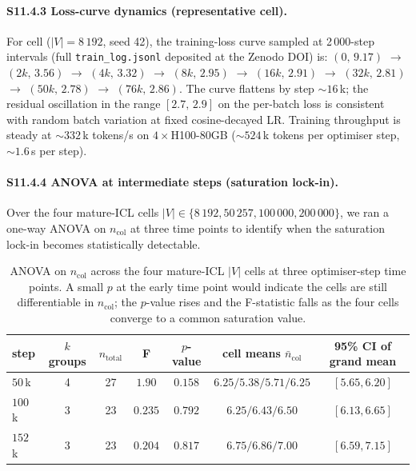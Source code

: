 \documentclass[11pt,a4paper]{article}
\begin{document}
\paragraph{S11.4.3 Loss-curve dynamics (representative cell).}
For cell ($|V|\!=\!8\,192$, seed 42), the training-loss curve
sampled at 2\,000-step intervals (full \texttt{train\_log.jsonl}
deposited at the Zenodo DOI) is:
$(0,\,9.17)$ $\to$ $(2k,\,3.56)$ $\to$ $(4k,\,3.32)$ $\to$
$(8k,\,2.95)$ $\to$ $(16k,\,2.91)$ $\to$ $(32k,\,2.81)$ $\to$
$(50k,\,2.78)$ $\to$ $(76k,\,2.86)$. The curve flattens by
step $\sim\!16$\,k; the residual oscillation in the range
$[2.7,\,2.9]$ on the per-batch loss is consistent with random
batch variation at fixed cosine-decayed LR. Training throughput is
steady at $\sim\!332$\,k tokens/s on $4\!\times\!$H100-80GB
($\sim\!524$\,k tokens per optimiser step, $\sim\!1.6$\,s per step).

\paragraph{S11.4.4 ANOVA at intermediate steps (saturation lock-in).}
Over the four mature-ICL cells $|V|\!\in\!\{8\,192, 50\,257,
100\,000, 200\,000\}$, we ran a one-way ANOVA on $n_\mathrm{col}$
at three time points to identify when the saturation lock-in
becomes statistically detectable.

\begin{table}[h]
\centering
\small
\caption{ANOVA on $n_\mathrm{col}$ across the four mature-ICL
$|V|$ cells at three optimiser-step time points.
A small $p$ at the early time point would indicate the cells are
still differentiable in $n_\mathrm{col}$; the $p$-value rises and
the F-statistic falls as the four cells converge to a common
saturation value.}
\label{tab:S11-anova-intermediate}
\begin{tabular}{lcccccc}
\toprule
step       & $k$ groups & $n_\mathrm{total}$ & F & $p$-value & cell means $\bar n_\mathrm{col}$
           & 95\% CI of grand mean \\
\midrule
$50$\,k    & 4 & 27 & $1.90$ & $0.158$ & $6.25 / 5.38 / 5.71 / 6.25$  & $[5.65, 6.20]$ \\
$100$\,k   & 3 & 23 & $0.235$ & $0.792$ & $6.25 / 6.43 / 6.50$         & $[6.13, 6.65]$ \\
$152$\,k   & 3 & 23 & $0.204$ & $0.817$ & $6.75 / 6.86 / 7.00$         & $[6.59, 7.15]$ \\
\bottomrule
\end{tabular}
\end{table}
\end{document}
